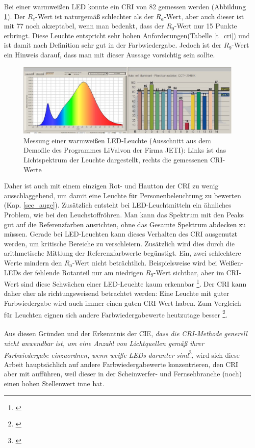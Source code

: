 Bei einer warmweißen LED konnte ein CRI von 82 gemessen werden (Abbildung \ref{b_cri2}). Der $R_{e}$-Wert ist naturgemäß schlechter als der $R_{a}$-Wert, aber auch dieser ist mit 77 noch akzeptabel, wenn man bedenkt, dass der $R_{9}$-Wert nur 15 Punkte erbringt. Diese Leuchte entspricht \glqq sehr hohen Anforderungen\grqq (Tabelle \ref{t_cri}) und ist damit nach Definition sehr gut in der Farbwiedergabe. Jedoch ist der $R_{9}$-Wert ein Hinweis darauf, dass man mit dieser Aussage vorsichtig sein sollte.

\begin{figure}[htp]     %
\centering
\includegraphics[width=1.0\textwidth]{bilder/cri2} 
\caption {Messung einer warmweißen LED-Leuchte (Ausschnitt aus dem Demofile des Programmes \glqq LiVal\grqq von der Firma JETI): Links ist das Lichtspektrum der Leuchte dargestellt, rechts die gemessenen CRI-Werte  \protect\footnotemark}\label{b_cri2}
\end{figure}

Daher ist auch mit einem einzigen Rot- und Hautton der CRI zu wenig ausschlaggebend, um damit eine Leuchte für Personenbeleuchtung zu bewerten (Kap. \ref{sec_auge}). Zusätzlich entsteht bei LED-Leuchtmitteln ein ähnliches Problem, wie bei den Leuchstoffröhren. Man kann das Spektrum mit den Peaks gut auf die Referenzfarben ausrichten, ohne das Gesamte Spektrum abdecken zu müssen. Gerade bei LED-Leuchten kann dieses Verhalten des CRI ausgenutzt werden, um kritische Bereiche zu verschleiern. Zusätzlich wird dies durch die arithmetische Mittlung der Referenzfarbwerte begünstigt. Ein, zwei schlechtere Werte mindern den $R_{a}$-Wert nicht beträchtlich. Beispielsweise wird bei Weißen-LEDs der fehlende Rotanteil nur am niedrigen $R_{9}$-Wert sichtbar, aber im CRI-Wert sind diese Schwächen einer LED-Leuchte kaum erkennbar \footnote{\cite{davis_ohno}}. Der CRI kann daher eher als richtungsweisend betrachtet werden: Eine Leuchte mit guter Farbwiedergabe wird auch immer einen guten CRI-Wert haben. Zum Vergleich für Leuchten eignen sich andere Farbwiedergabewerte heutzutage besser \footnote{\cite{production partner}}.\\\\
Aus diesen Gründen und der Erkenntnis der CIE, \emph{\glqq dass die CRI-Methode generell nicht anwendbar ist, um eine Anzahl von Lichtquellen gemäß ihrer Farbwiedergabe einzuordnen, wenn weiße LEDs darunter sind\grqq}\footnote{\citep[VI]{CIE}}, wird sich diese Arbeit hauptsächlich auf andere Farbwiedergabewerte konzentrieren, den CRI aber mit aufführen, weil dieser in der Scheinwerfer- und Fernsehbranche (noch) einen hohen Stellenwert inne hat.

